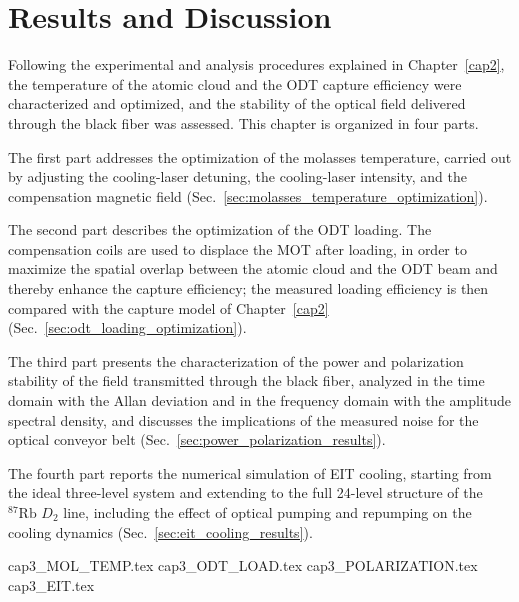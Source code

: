 \documentclass[../../thesis_main.tex]{subfiles}
\begin{document}
    \ifSubfilesClassLoaded{\tableofcontents}{}

\chapter{Results and Discussion}

Following the experimental and analysis procedures explained in
Chapter~\ref{cap2}, the temperature of the atomic cloud and the ODT
capture efficiency were characterized and optimized, and the stability
of the optical field delivered through the black fiber was assessed.
This chapter is organized in four parts.

The first part addresses the optimization of the molasses temperature,
carried out by adjusting the cooling-laser detuning, the cooling-laser
intensity, and the compensation magnetic field (Sec.~\ref{sec:molasses_temperature_optimization}).

The second part describes the optimization of the ODT loading. The
compensation coils are used to displace the MOT after loading, in
order to maximize the spatial overlap between the atomic cloud and the
ODT beam and thereby enhance the capture efficiency; the measured
loading efficiency is then compared with the capture model of
Chapter~\ref{cap2} (Sec.~\ref{sec:odt_loading_optimization}).

The third part presents the characterization of the power and
polarization stability of the field transmitted through the black
fiber, analyzed in the time domain with the Allan deviation and in the
frequency domain with the amplitude spectral density, and discusses the
implications of the measured noise for the optical conveyor belt
(Sec.~\ref{sec:power_polarization_results}).

The fourth part reports the numerical simulation of EIT cooling,
starting from the ideal three-level system and extending to the full
24-level structure of the $^{87}\mathrm{Rb}$ $D_2$ line, including the
effect of optical pumping and repumping on the cooling dynamics
(Sec.~\ref{sec:eit_cooling_results}).

    {cap3_MOL_TEMP.tex}
    \clearpage
    {cap3_ODT_LOAD.tex}
    \clearpage
    {cap3_POLARIZATION.tex}
    \clearpage
    {cap3_EIT.tex}


    \ifSubfilesClassLoaded{\printbibliography}{}
\end{document}
